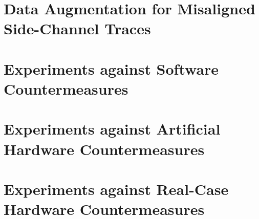 \section{Data Augmentation for Misaligned Side-Channel Traces}

\section{Experiments against Software Countermeasures}



\section{Experiments against Artificial Hardware Countermeasures}\label{sec:hardware}%


\section{Experiments against Real-Case Hardware Countermeasures}